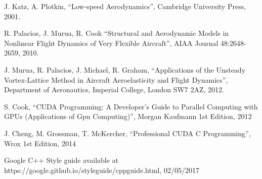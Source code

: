 \documentclass[a4paper, 11pt, article]{report}
\begin{document}
\begingroup
\renewcommand{\section}[2]{}%
\begin{thebibliography}{1}

 J. Katz, A. Plotkin, “Low-speed Aerodynamics”, Cambridge University Press, 2001.

 R. Palacios, J. Murua, R. Cook “Structural and Aerodynamic Models in Nonlinear Flight Dynamics of Very Flexible Aircraft”, AIAA Journal 48:2648-2659, 2010.

 J. Murua, R. Palacios, J. Michael, R. Graham, “Applications of the Unsteady Vortex-Lattice Method in Aircraft Aeroelasticity and Flight Dynamics”, Department of Aeronautics, Imperial College, London SW7 2AZ, 2012.

 S. Cook, “CUDA Programming: A Developer's Guide to Parallel Computing with GPUs (Applications of Gpu Computing)”, Morgan Kaufmann 1st Edition, 2012

 J. Cheng, M. Grossman, T. McKercher, “Professional CUDA C Programming”, Wrox 1st Edition, 2014

 Google C++ Style guide available at https://google.github.io/styleguide/cppguide.html, 02/05/2017

\end{thebibliography}
\endgroup
   
\end{document}
